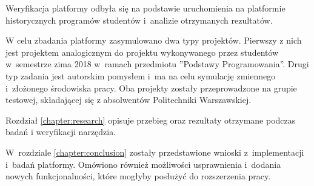 Weryfikacja platformy odbyła się na podstawie uruchomienia na platformie historycznych programów studentów i~analizie otrzymanych rezultatów.

W celu zbadania platformy zasymulowano dwa typy projektów.
Pierwszy z nich jest projektem analogicznym do projektu wykonywanego przez studentów w~semestrze zima 2018 w~ramach przedmiotu ”Podstawy Programowania”.
Drugi typ zadania jest autorskim pomysłem i~ma na celu symulację zmiennego i~złożonego środowiska pracy.
Oba projekty zostały przeprowadzone na grupie testowej, składającej się z absolwentów Politechniki Warszawskiej.

Rozdział \ref{chapter:research} opisuje przebieg oraz rezultaty otrzymane podczas badań i weryfikacji narzędzia.

W~rozdziale \ref{chapter:conclusion} zostały przedstawione wnioski z~implementacji i~badań platformy.
Omówiono również możliwości usprawnienia i~dodania nowych funkcjonalności, które mogłyby posłużyć do rozszerzenia pracy.





